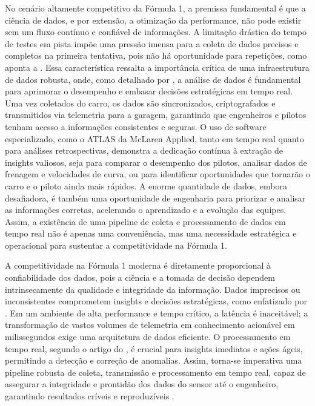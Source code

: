\documentclass[12pt, %
openright, 
oneside, %
a4paper,    %
brazil]{facom-ufu-abntex2}
\begin{document}
No cenário altamente competitivo da Fórmula 1, a premissa fundamental é que a 
ciência de dados, e por extensão, a otimização da performance, não pode existir sem 
um fluxo contínuo e confiável de informações. A limitação drástica do tempo de testes 
em pista impõe uma pressão imensa para a coleta de dados precisos e completos na 
primeira tentativa, pois não há oportunidade para repetições, como aponta a 
. Essa característica ressalta a importância crítica de 
uma infraestrutura de dados robusta, onde, como detalhado por , a 
análise de dados é fundamental para aprimorar o desempenho e embasar decisões 
estratégicas em tempo real. Uma vez coletados do carro, os dados são sincronizados, 
criptografados e transmitidos via telemetria para a garagem, garantindo que engenheiros
e pilotos tenham acesso a informações consistentes e seguras. O uso de software 
especializado, como o ATLAS da McLaren Applied, tanto em tempo real quanto para 
análises retrospectivas, demonstra a dedicação contínua à extração de insights valiosos,
seja para comparar o desempenho dos pilotos, analisar dados de frenagem e velocidades 
de curva, ou para identificar oportunidades que tornarão o carro e o piloto ainda mais 
rápidos. A enorme quantidade de dados, embora desafiadora, é também uma oportunidade de 
engenharia para priorizar e analisar as informações corretas, acelerando o aprendizado 
e a evolução das equipes. Assim, a existência de uma pipeline de coleta e processamento 
de dados em tempo real não é apenas uma conveniência, mas uma necessidade estratégica e 
operacional para sustentar a competitividade na Fórmula 1.

A competitividade na Fórmula 1 moderna é diretamente proporcional à confiabilidade dos 
dados, pois a ciência e a tomada de decisão dependem intrinsecamente da qualidade e 
integridade da informação. Dados imprecisos ou inconsistentes comprometem insights e 
decisões estratégicas, como enfatizado por . Em um ambiente de alta 
performance e tempo crítico, a latência é inaceitável; a transformação de vastos volumes
de telemetria em conhecimento acionável em milissegundos exige uma arquitetura de dados 
eficiente. O processamento em tempo real, segundo o artigo do , é crucial para insights 
imediatos e ações ágeis, permitindo a detecção e correção de anomalias. Assim, torna-se 
imperativa uma pipeline robusta de coleta, transmissão e processamento em tempo real, 
capaz de assegurar a integridade e prontidão dos dados do sensor até o engenheiro, 
garantindo resultados críveis e reproduzíveis \cite{SciSure}.
\end{document}
